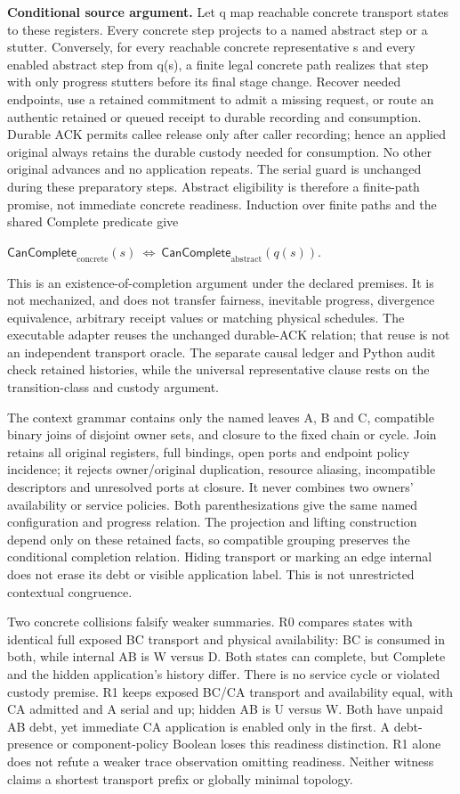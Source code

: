 \documentclass[11pt,a4paper]{article}
\theoremstyle{definition}
\theoremstyle{remark}
\begin{document}
\textbf{Conditional source argument.} Let q map reachable concrete transport states to these registers. Every concrete step projects to a named abstract step or a stutter. Conversely, for every reachable concrete representative s and every enabled abstract step from q(s), a finite legal concrete path realizes that step with only progress stutters before its final stage change. Recover needed endpoints, use a retained commitment to admit a missing request, or route an authentic retained or queued receipt to durable recording and consumption. Durable ACK permits callee release only after caller recording; hence an applied original always retains the durable custody needed for consumption. No other original advances and no application repeats. The serial guard is unchanged during these preparatory steps. Abstract eligibility is therefore a finite-path promise, not immediate concrete readiness. Induction over finite paths and the shared Complete predicate give

$\mathsf{CanComplete}_{\mathrm{concrete}}(s)\ \Longleftrightarrow\ \mathsf{CanComplete}_{\mathrm{abstract}}(q(s))$.

This is an existence-of-completion argument under the declared premises. It is not mechanized, and does not transfer fairness, inevitable progress, divergence equivalence, arbitrary receipt values or matching physical schedules. The executable adapter reuses the unchanged durable-ACK relation; that reuse is not an independent transport oracle. The separate causal ledger and Python audit check retained histories, while the universal representative clause rests on the transition-class and custody argument.

The context grammar contains only the named leaves A, B and C, compatible binary joins of disjoint owner sets, and closure to the fixed chain or cycle. Join retains all original registers, full bindings, open ports and endpoint policy incidence; it rejects owner/original duplication, resource aliasing, incompatible descriptors and unresolved ports at closure. It never combines two owners' availability or service policies. Both parenthesizations give the same named configuration and progress relation. The projection and lifting construction depend only on these retained facts, so compatible grouping preserves the conditional completion relation. Hiding transport or marking an edge internal does not erase its debt or visible application label. This is not unrestricted contextual congruence.

Two concrete collisions falsify weaker summaries. R0 compares states with identical full exposed BC transport and physical availability: BC is consumed in both, while internal AB is W versus D. Both states can complete, but Complete and the hidden application's history differ. There is no service cycle or violated custody premise. R1 keeps exposed BC/CA transport and availability equal, with CA admitted and A serial and up; hidden AB is U versus W. Both have unpaid AB debt, yet immediate CA application is enabled only in the first. A debt-presence or component-policy Boolean loses this readiness distinction. R1 alone does not refute a weaker trace observation omitting readiness. Neither witness claims a shortest transport prefix or globally minimal topology.
\end{document}
